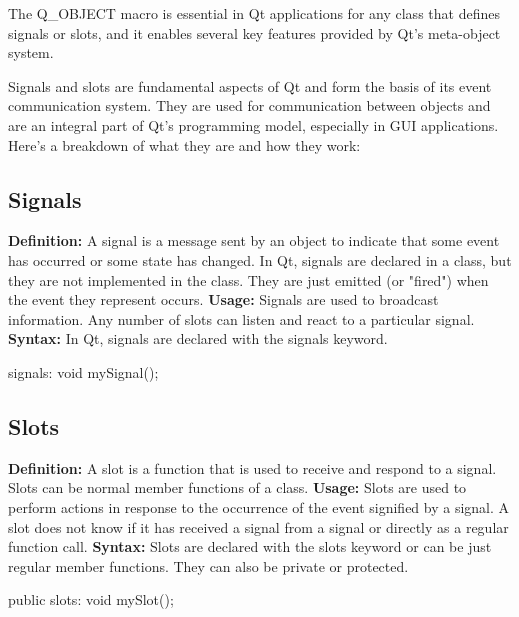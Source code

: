 \documentclass{report}
\begin{document}
    \pagebreak
    \bigbreak \noindent 
    The Q\_OBJECT macro is essential in Qt applications for any class that defines signals or slots, and it enables several key features provided by Qt's meta-object system.
    \bigbreak \noindent 

    \bigbreak \noindent 
    \bigbreak \noindent 
    Signals and slots are fundamental aspects of Qt and form the basis of its event communication system. They are used for communication between objects and are an integral part of Qt's programming model, especially in GUI applications. Here's a breakdown of what they are and how they work:
    \bigbreak \noindent 
    \subsection{Signals}
    \bigbreak \noindent 
    \textbf{Definition:} A signal is a message sent by an object to indicate that some event has occurred or some state has changed. In Qt, signals are declared in a class, but they are not implemented in the class. They are just emitted (or "fired") when the event they represent occurs.
    \bigbreak \noindent 
    \textbf{Usage:} Signals are used to broadcast information. Any number of slots can listen and react to a particular signal.
    \bigbreak \noindent 
    \textbf{Syntax:} In Qt, signals are declared with the signals keyword.
    \bigbreak \noindent 
    \begin{cppcode}
signals:
    void mySignal();
    \end{cppcode}

    \bigbreak \noindent 
    \subsection{Slots}
    \bigbreak \noindent 
    \textbf{Definition:} A slot is a function that is used to receive and respond to a signal. Slots can be normal member functions of a class.
    \bigbreak \noindent 
    \textbf{Usage:} Slots are used to perform actions in response to the occurrence of the event signified by a signal. A slot does not know if it has received a signal from a signal or directly as a regular function call.
    \bigbreak \noindent 
    \textbf{Syntax:} Slots are declared with the slots keyword or can be just regular member functions. They can also be private or protected.
    \bigbreak \noindent 
    \begin{cppcode}
public slots:
    void mySlot();
    \end{cppcode}
\end{document}
